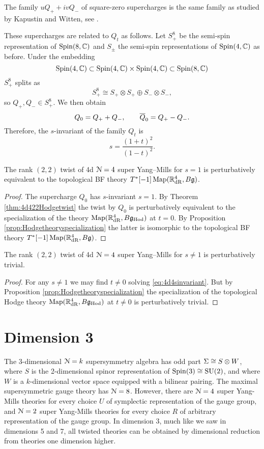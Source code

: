 \documentclass[10pt, oneside]{article}
\newcommand{\Hod}{\mathrm{Hod}}
\begin{document}
\begin{remark}
The family $uQ_+ + iv Q_-$ of square-zero supercharges is the same family as studied by Kapustin and Witten, see \cite[Section 3.1]{KapustinWitten}.
\end{remark}

These supercharges are related to $Q_t$ as follows. Let $S_+^8$ be the semi-spin representation of $\Spin(8, \CC)$ and $S_\pm$ the semi-spin representations of $\Spin(4, \CC)$ as before. Under the embedding
\[\Spin(4, \CC)\subset \Spin(4, \CC)\times \Spin(4, \CC)\subset \Spin(8, \CC)\]
$S_+^8$ splits as
\[S_+^8\cong S_+\otimes S_+\oplus S_-\otimes S_-,\]
so $Q_+, Q_-\in S_+^8$. We then obtain
\[Q_0 = Q_+ + Q_-,\qquad \Bar{Q}_0 = Q_+ - Q_-.\]
Therefore, the $s$-invariant of the family $Q_t$ is
\begin{equation}
s = \frac{(1+t)^2}{(1-t)^2}.
\label{eq:4d4sinvariant}
\end{equation}

\begin{corollary}
The rank $(2, 2)$ twist of 4d $\cN=4$ super Yang--Mills for $s=1$ is perturbatively equivalent to the topological BF theory $T^*[-1]\map(\RR^4_{\mathrm{dR}}, B\fg)$.
\end{corollary}
\begin{proof}
The supercharge $Q_0$ has $s$-invariant $s=1$. By Theorem \ref{thm:4d422Hodgetwist} the twist by $Q_0$ is perturbatively equivalent to the specialization of the theory $\map(\RR^4_{\mathrm{dR}}, B\fg_{\Hod})$ at $t=0$. By Proposition \ref{prop:Hodgetheoryspecialization} the latter is isomorphic to the topological BF theory $T^*[-1]\map(\RR^4_{\mathrm{dR}}, B\fg)$.
\end{proof}

\begin{corollary}
The rank $(2, 2)$ twist of 4d $\cN=4$ super Yang--Mills for $s\neq 1$ is perturbatively trivial.
\end{corollary}
\begin{proof}
For any $s\neq 1$ we may find $t\neq 0$ solving \eqref{eq:4d4sinvariant}. But by Proposition \ref{prop:Hodgetheoryspecialization} the specialization of the topological Hodge theory $\map(\RR^4_{\mathrm{dR}}, B\fg_{\Hod})$ at $t\neq 0$ is perturbatively trivial.
\end{proof}

\section{Dimension 3}
The 3-dimensional $\mc N=k$ supersymmetry algebra has odd part $\Sigma \iso S \otimes W$, where $S$ is the 2-dimensional spinor representation of $\Spin(3) \iso \SU(2)$, and where $W$ is a $k$-dimensional vector space equipped with a bilinear pairing.  The maximal supersymmetric gauge theory has $\mc N=8$.  However, there are $\mc N=4$ super Yang-Mills theories for every choice $U$ of symplectic representation of the gauge group, and $\mc N=2$ super Yang-Mills theories for every choice $R$ of arbitrary representation of the gauge group.  In dimension 3, much like we saw in dimensions 5 and 7, all twisted theories can be obtained by dimensional reduction from theories one dimension higher.
\end{document}
